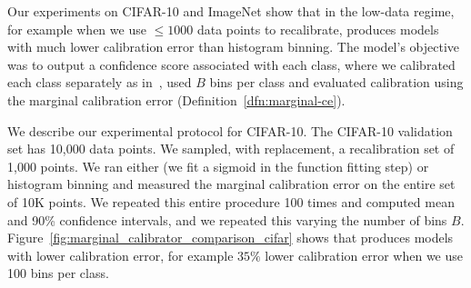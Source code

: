 Our experiments on CIFAR-10 and ImageNet show that in the low-data regime, for example when we use $\leq 1000$ data points to recalibrate, \ourcal{} produces models with much lower calibration error than histogram binning. The model's objective  was to output a confidence score associated with each class, where we calibrated each class separately as in~\cite{zadrozny2002transforming}, used $B$ bins per class and evaluated calibration using the marginal calibration error (Definition~\ref{dfn:marginal-ce}).

We describe our experimental protocol for CIFAR-10.
The CIFAR-10 validation set has 10,000 data points. We sampled, with replacement, a recalibration set of 1,000 points. We ran either \ourcal{} (we fit a sigmoid in the function fitting step) or histogram binning and measured the marginal calibration error on the entire set of 10K points.
We repeated this entire procedure 100 times and computed mean and 90\% confidence intervals, and we repeated this varying the number of bins $B$. Figure~\ref{fig:marginal_calibrator_comparison_cifar} shows that \ourcal{} produces models with lower calibration error, for example $35\%$ lower calibration error when we use 100 bins per class.

